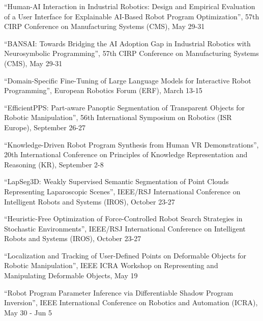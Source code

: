 \documentclass[11pt]{article} %
\begin{document}
\medskip

``Human-AI Interaction in Industrial Robotics: Design and Empirical Evaluation of a User Interface for Explainable AI-Based Robot Program Optimization'', 57th CIRP Conference on Manufacturing Systems (CMS), May 29-31

\medskip

``BANSAI: Towards Bridging the AI Adoption Gap in Industrial Robotics with Neurosymbolic Programming'', 57th CIRP Conference on Manufacturing Systems (CMS), May 29-31

\medskip

``Domain-Specific Fine-Tuning of Large Language Models for Interactive Robot Programming'', European Robotics Forum (ERF), March 13-15

\medskip


``EfficientPPS: Part-aware Panoptic Segmentation of Transparent Objects for Robotic Manipulation'', 56th International Symposium on Robotics (ISR Europe), September 26-27

\medskip

``Knowledge-Driven Robot Program Synthesis from Human VR Demonstrations'', 20th International Conference on Principles of Knowledge Representation and Reasoning (KR), September 2-8

\medskip


``LapSeg3D: Weakly Supervised Semantic Segmentation of Point Clouds Representing Laparoscopic Scenes'', IEEE/RSJ International Conference on Intelligent Robots and Systems (IROS), October 23-27

\medskip

``Heuristic-Free Optimization of Force-Controlled Robot Search Strategies in Stochastic Environments'', IEEE/RSJ International Conference on Intelligent Robots and Systems (IROS), October 23-27

\medskip

``Localization and Tracking of User-Defined Points on Deformable Objects for Robotic Manipulation'', IEEE ICRA Workshop on Representing and Manipulating Deformable Objects, May 19

\medskip

``Robot Program Parameter Inference via Differentiable Shadow Program Inversion'', IEEE International Conference on Robotics and Automation (ICRA), May 30 - Jun 5

\medskip

\end{document}
